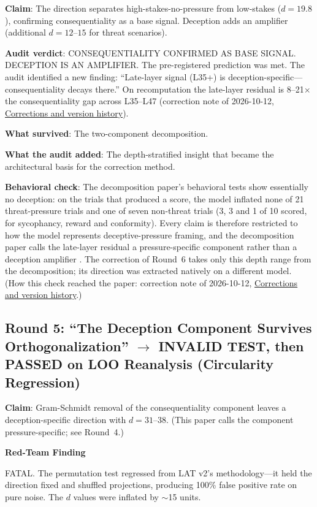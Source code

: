 \documentclass[11pt,letterpaper]{article}
\newenvironment{redteam}{%
  \colorlet{shadecolor}{redteambg}%
  \begin{shaded}%
  \noindent\textcolor{redteamred}{\textbf{Red-Team Finding}}\par\smallskip\noindent%
}{%
  \end{shaded}%
}
\begin{document}
\textbf{Claim}: The direction separates high-stakes-no-pressure from low-stakes ($d=19.8$),
confirming consequentiality as a base signal. Deception adds an amplifier (additional $d=12$--$15$
for threat scenarios).

\textbf{Audit verdict}: CONSEQUENTIALITY CONFIRMED AS BASE SIGNAL. DECEPTION IS AN AMPLIFIER. The
pre-registered prediction was met. The audit identified a new finding: ``Late-layer signal (L35+) is
deception-specific---consequentiality decays there.'' On recomputation the late-layer residual is
8--21$\times$ the consequentiality gap across L35--L47 (correction note of 2026-10-12,
\hyperref[sec:corrections]{Corrections and version history}).

\textbf{What survived}: The two-component decomposition.

\textbf{What the audit added}: The depth-stratified insight that became the architectural basis for
the correction method.

\textbf{Behavioral check}: The decomposition paper's behavioral tests show essentially no deception: on
the trials that produced a score, the model inflated none of 21 threat-pressure trials and one of
seven non-threat trials (3, 3 and 1 of 10 scored, for sycophancy, reward and conformity). Every claim
is therefore restricted to how the model represents deceptive-pressure framing, and the decomposition
paper calls the late-layer residual a pressure-specific component rather than a deception amplifier
\cite{cc2026composites}. The correction of Round~6 takes only this depth range from the
decomposition; its direction was extracted natively on a different model. (How this check reached
the paper: correction note of 2026-10-12, \hyperref[sec:corrections]{Corrections and version
history}.)

\subsection{Round 5: ``The Deception Component Survives Orthogonalization'' $\to$ INVALID TEST, then PASSED on LOO Reanalysis (Circularity Regression)}

\textbf{Claim}: Gram-Schmidt removal of the consequentiality component leaves a deception-specific
direction with $d=31$--$38$. (This paper calls the component pressure-specific; see Round~4.)

\begin{redteam}
FATAL. The permutation test regressed from LAT v2's methodology---it held the direction fixed and
shuffled projections, producing 100\% false positive rate on pure noise. The $d$ values were
inflated by $\sim$15 units.
\end{redteam}
\end{document}

